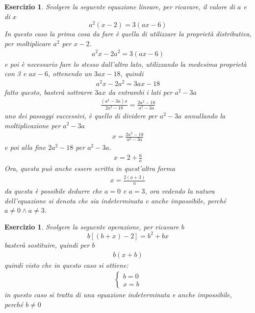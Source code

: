\documentclass{book}
\newtheorem{es}[section]{Esercizio}
\begin{document}
\begin{es}
  \label{es:esercizio2}
  Svolgere la seguente equazione lineare, per ricavare, il valore di $a$ e di $x$
  \begin{equation}
    \label{eq:esercizio2}
    a^2(x-2)=3(ax-6)
  \end{equation}
  In questo caso la prima cosa da fare è quella di utilizzare la proprietà distributiva,
  per moltiplicare $a^2$ per $x-2$.
  \begin{eqnarray*}
    a^2x-2a^2=3(ax-6)
  \end{eqnarray*}
  e poi è necessario fare lo stesso dall'altro lato, utilizzando la medesima proprietà
  con 3 e $ax-6$, ottenendo un $3ax-18$, quindi
  \begin{eqnarray*}
    a^2x-2a^2=3ax-18
  \end{eqnarray*}
  fatto questo, basterà sottrarre $3ax$ da entrambi i lati per $a^2-3a$
  \begin{eqnarray*}
    \frac{(a^2-3a)x}{2a^2-18}=\frac{2a^2-18}{a^2-3a}
  \end{eqnarray*}
  uno dei passaggi successivi, è quello di dividere per $a^2-3a$ annullando la
  moltiplicazione per $a^2-3a$
  \begin{eqnarray*}
    x=\frac{2a^2-18}{a^2-3a}
  \end{eqnarray*}
  e poi alla fine $2a^2-18$ per $a^2-3a$.
  \begin{eqnarray*}
    x=2+\frac{6}{a}
  \end{eqnarray*}
  Ora, questa può anche essere scritta in quest'altra forma
  \begin{eqnarray*}
    x=\frac{2(a+3)}{a}
  \end{eqnarray*}
  da questa è possibile dedurre che $a=0$ e $a=3$, ora vedendo la natura dell'equazione
  si denota che sia indeterminata e anche impossibile, perché $a\neq 0 \wedge a\neq 3$.
\end{es}
\begin{es}
  \label{es:esercizio3}
  Svolgere la seguente operazione, per ricavare $b$
  \begin{equation}
    \label{eq:esercizio3}
    b[(b+x)-2]=b^2+bx
  \end{equation}
  basterà sostituire, quindi per $b$
  \begin{eqnarray*}
    b(x+b)
  \end{eqnarray*}
  quindi visto che in questo caso si ottiene:
  \begin{eqnarray*}
    \begin{cases}
      b=0\\
      x=b
    \end{cases}
  \end{eqnarray*}
  in questo caso si tratta di una equazione indeterminata e anche impossibile,
  perché $b\neq0$
\end{es}
\end{document}
